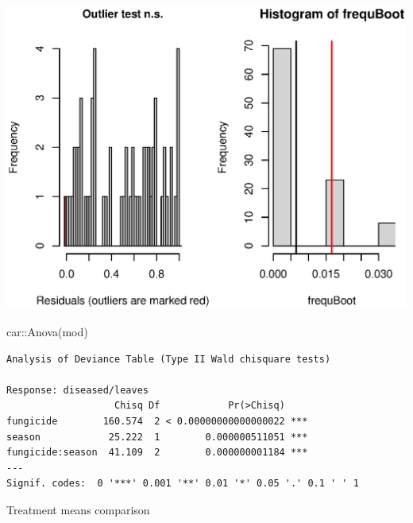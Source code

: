 \documentclass[
  letterpaper,
  DIV=11,
  numbers=noendperiod]{scrreport}
\newenvironment{Shaded}{\begin{snugshade}}{\end{snugshade}}
\newcommand{\FunctionTok}[1]{\textcolor[rgb]{0.28,0.35,0.67}{#1}}
\newcommand{\NormalTok}[1]{\textcolor[rgb]{0.00,0.23,0.31}{#1}}
\newcommand{\SpecialCharTok}[1]{\textcolor[rgb]{0.37,0.37,0.37}{#1}}
\begin{document}
\includegraphics{Residuals plot (in field).eps}

\begin{Shaded}
\begin{Highlighting}[]
\NormalTok{car}\SpecialCharTok{::}\FunctionTok{Anova}\NormalTok{(mod)}
\end{Highlighting}
\end{Shaded}

\begin{verbatim}
Analysis of Deviance Table (Type II Wald chisquare tests)

Response: diseased/leaves
                   Chisq Df            Pr(>Chisq)    
fungicide        160.574  2 < 0.00000000000000022 ***
season            25.222  1        0.000000511051 ***
fungicide:season  41.109  2        0.000000001184 ***
---
Signif. codes:  0 '***' 0.001 '**' 0.01 '*' 0.05 '.' 0.1 ' ' 1
\end{verbatim}

Treatment means comparison
\end{document}
